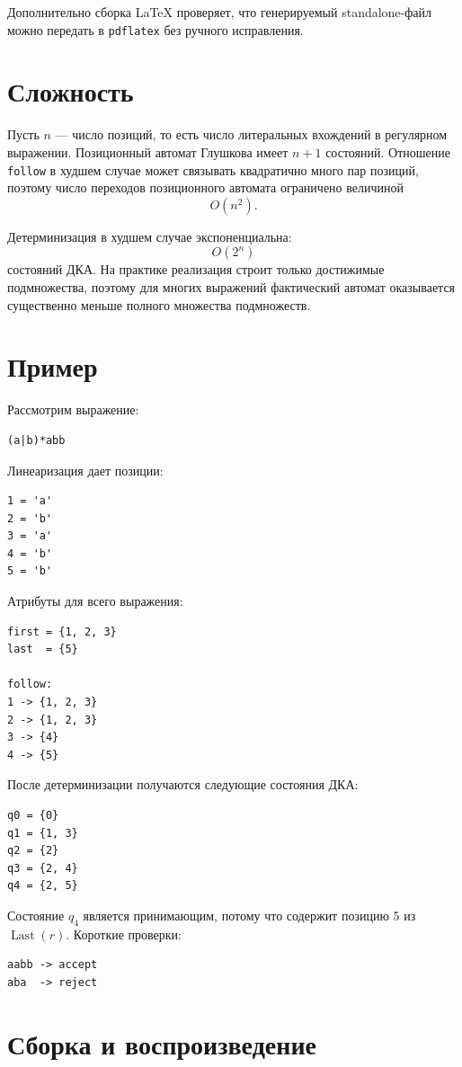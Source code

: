 \documentclass[12pt,a4paper]{article}
\newcommand{\Last}{\operatorname{Last}}
\begin{document}
Дополнительно сборка LaTeX проверяет, что генерируемый standalone-файл можно
передать в \verb|pdflatex| без ручного исправления.

\section{Сложность}

Пусть $n$ --- число позиций, то есть число литеральных вхождений в регулярном
выражении. Позиционный автомат Глушкова имеет $n+1$ состояний. Отношение
\verb|follow| в худшем случае может связывать квадратично много пар позиций,
поэтому число переходов позиционного автомата ограничено величиной
\[
O(n^2).
\]

Детерминизация в худшем случае экспоненциальна:
\[
O(2^n)
\]
состояний ДКА. На практике реализация строит только достижимые подмножества,
поэтому для многих выражений фактический автомат оказывается существенно
меньше полного множества подмножеств.

\section{Пример}

Рассмотрим выражение:
\begin{verbatim}
(a|b)*abb
\end{verbatim}

Линеаризация дает позиции:
\begin{verbatim}
1 = 'a'
2 = 'b'
3 = 'a'
4 = 'b'
5 = 'b'
\end{verbatim}

Атрибуты для всего выражения:
\begin{verbatim}
first = {1, 2, 3}
last  = {5}

follow:
1 -> {1, 2, 3}
2 -> {1, 2, 3}
3 -> {4}
4 -> {5}
\end{verbatim}

После детерминизации получаются следующие состояния ДКА:
\begin{verbatim}
q0 = {0}
q1 = {1, 3}
q2 = {2}
q3 = {2, 4}
q4 = {2, 5}
\end{verbatim}

Состояние $q_4$ является принимающим, потому что содержит позицию 5 из
$\Last(r)$. Короткие проверки:
\begin{verbatim}
aabb -> accept
aba  -> reject
\end{verbatim}

\section{Сборка и воспроизведение}
\end{document}
